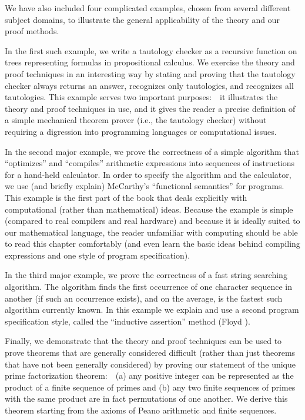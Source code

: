 \documentclass[11pt]{book}
\begin{document}
We have also included four  complicated examples,
chosen from several different subject domains, to illustrate the
general applicability of the theory and our proof methods.

In the first such example, we write a tautology
checker as a recursive function on
trees representing formulas in  propositional calculus.
We exercise
the theory and proof techniques in an interesting way by stating and
proving that the tautology checker
always returns an answer,  recognizes only
tautologies, and recognizes all tautologies.  This example serves two important
purposes:~~it illustrates the theory and proof techniques in use,
and it gives the reader a precise definition of a simple
mechanical theorem prover (i.e., the tautology checker) without requiring a digression into programming
languages or computational issues.

In the second major example, we prove the correctness
of a simple algorithm that ``optimizes'' and ``compiles'' arithmetic
expressions into sequences of instructions for a hand-held calculator.
In order to specify the algorithm and the calculator, we use
(and briefly explain) McCarthy's ``functional semantics''  \cite{MCCARTHYBASIS} for programs.
This example is the first part of the book that deals explicitly with
computational (rather than mathematical) ideas.  Because the example is
simple (compared to real compilers and real hardware) and because it is
ideally suited to our mathematical language, the reader unfamiliar
with computing should be able to read this chapter comfortably
(and even learn the basic ideas behind compiling expressions and one style of program
specification).

In the third major example, we prove the correctness of a
fast string searching algorithm.  The algorithm finds the
first occurrence of one character sequence in another (if such an occurrence exists), and on the average, is the fastest such algorithm currently known.  In this example
we explain and use a second program specification style, called
the ``inductive assertion'' method (Floyd \cite{FLOYD}).

Finally, we demonstrate that the theory and proof techniques
can be used to prove theorems that are generally considered difficult
(rather than just theorems that have not been generally considered)
by proving our statement of the unique prime factorization theorem:~~(a) any
positive integer can be represented as the product of a finite sequence of
primes and (b) any two finite sequences of primes with the same product are in fact
permutations of one another.  We derive this theorem starting from
the axioms of Peano arithmetic and finite sequences.
\end{document}
